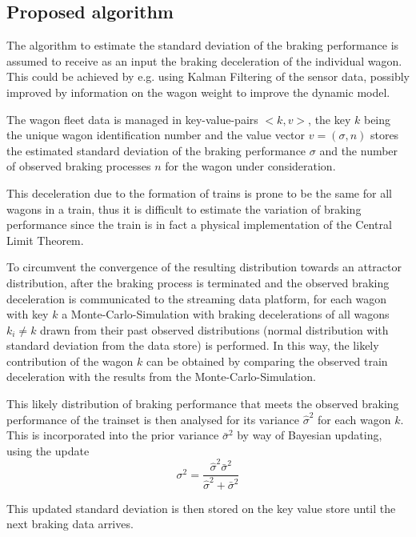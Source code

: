 \documentclass[a4paper, 12pt]{scrartcl}
\begin{document}
\subsection{Proposed algorithm}
The algorithm to estimate the standard deviation of the braking performance is assumed to receive as an input the braking deceleration of the individual wagon. This could be achieved by e.g. using Kalman Filtering of the sensor data, possibly improved by information on the wagon weight to improve the dynamic model.

The wagon fleet data is managed in key-value-pairs $<k, v>$, the key $k$ being the unique wagon identification number and the value vector $v = \left(\sigma, n\right)$ stores the estimated standard deviation of the braking performance $\sigma$ and the number of observed braking processes $n$ for the wagon under consideration.

This deceleration due to the formation of trains is prone to be the same for all wagons in a train, thus it is difficult to estimate the variation of braking performance since the train is in fact a physical implementation of the Central Limit Theorem. 

To circumvent the convergence of the resulting distribution towards an attractor distribution, after the braking process is terminated and the observed braking deceleration is communicated to the streaming data platform, for each wagon with key $k$ a Monte-Carlo-Simulation with braking decelerations of all wagons $k_{i} \neq k$ drawn from their past observed distributions (normal distribution with standard deviation from the data store) is performed. In this way, the likely contribution of the wagon $k$ can be obtained by comparing the observed train deceleration with the results from the Monte-Carlo-Simulation.

This likely distribution of braking performance that meets the observed braking performance of the trainset is then analysed for its variance $\hat{\sigma}^2$ for each wagon $k$. This is incorporated into the prior variance $\bar{\sigma}^2$ by way of Bayesian updating, using the update \cite{gelman2014bayesian}
\begin{equation}
\sigma^2 = \frac{\hat{\sigma}^2 \bar{\sigma}^2}{\hat{\sigma}^2 + \bar{\sigma}^2}
\end{equation}

This updated standard deviation is then stored on the key value store until the next braking data arrives.
\end{document}

